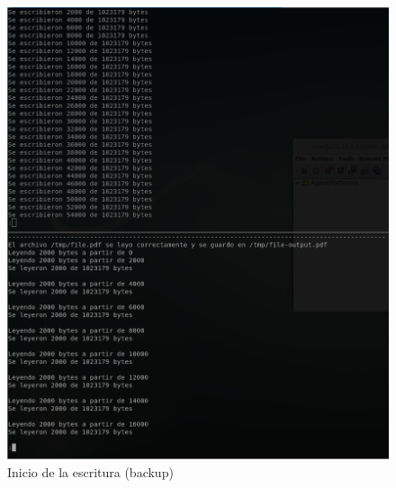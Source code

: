 \documentclass[12pt,journal,compsoc]{IEEEtran}
\begin{document}
\begin{figure}[H]
  \centering
  \includegraphics[width=160mm]{images/punto-3/readwrite/4-start-write.png}
  \caption{Inicio de la escritura (backup)}
  \label{fig:start-write-backup}
\end{figure}
\end{document}
